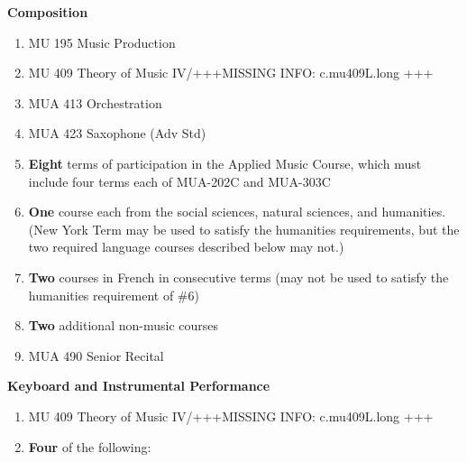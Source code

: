 \documentclass[
  letterpaper,
]{scrbook}
\providecommand{\tightlist}{%
  \setlength{\itemsep}{0pt}\setlength{\parskip}{0pt}}
\begin{document}
\begin{enumerate}
  \textbf{Composition}

  \begin{enumerate}
  \def\labelenumii{\arabic{enumii}.}
  \tightlist
  \item
    MU 195 Music Production
  \item
    MU 409 Theory of Music IV/+++MISSING INFO: c.mu409L.long +++
  \item
    MUA 413 Orchestration
  \item
    MUA 423 Saxophone (Adv Std)
  \item
    \textbf{Eight} terms of participation in the Applied Music Course,
    which must include four terms each of MUA-202C and MUA-303C
  \item
    \textbf{One} course each from the social sciences, natural sciences,
    and humanities. (New York Term may be used to satisfy the humanities
    requirements, but the two required language courses described below
    may not.)
  \item
    \textbf{Two} courses in French in consecutive terms (may not be used
    to satisfy the humanities requirement of \#6)
  \item
    \textbf{Two} additional non-music courses
  \item
    MUA 490 Senior Recital
  \end{enumerate}

  \textbf{Keyboard and Instrumental Performance}

  \begin{enumerate}
  \def\labelenumii{\arabic{enumii}.}
  \tightlist
  \item
    MU 409 Theory of Music IV/+++MISSING INFO: c.mu409L.long +++
  \item
    \textbf{Four} of the following:


\end{enumerate}
\end{enumerate}
\end{document}
